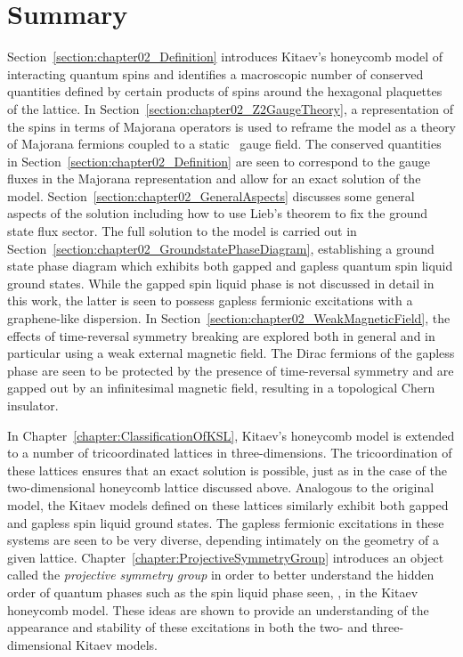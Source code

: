 \section{Summary}
\label{section:chapter02_Summary}
%
%
Section~\ref{section:chapter02_Definition} introduces Kitaev's honeycomb model of interacting quantum spins and identifies a macroscopic number of conserved quantities defined by certain products of spins around the hexagonal plaquettes of the lattice.
In Section~\ref{section:chapter02_Z2GaugeTheory}, a representation of the spins in terms of Majorana operators is used to reframe the model as a theory of Majorana fermions coupled to a static \ZZ~gauge field.
The conserved quantities in Section~\ref{section:chapter02_Definition} are seen to correspond to the gauge fluxes in the Majorana representation and allow for an exact solution of the model.
Section~\ref{section:chapter02_GeneralAspects} discusses some general aspects of the solution including how to use Lieb's theorem to fix the ground state flux sector.
The full solution to the model is carried out in Section~\ref{section:chapter02_GroundstatePhaseDiagram}, establishing a ground state phase diagram which exhibits both gapped and gapless quantum spin liquid ground states.
While the gapped spin liquid phase is not discussed in detail in this work, the latter is seen to possess gapless fermionic excitations with a graphene-like dispersion.
In Section~\ref{section:chapter02_WeakMagneticField}, the effects of time-reversal symmetry breaking are explored both in general and in particular using a weak external magnetic field.
The Dirac fermions of the gapless phase are seen to be protected by the presence of time-reversal symmetry and are gapped out by an infinitesimal magnetic field, resulting in a topological Chern insulator.

In Chapter~\ref{chapter:ClassificationOfKSL}, Kitaev's honeycomb model is extended to a number of tricoordinated lattices in three-dimensions.
The tricoordination of these lattices ensures that an exact solution is possible, just as in the case of the two-dimensional honeycomb lattice discussed above.
Analogous to the original model, the Kitaev models defined on these lattices similarly exhibit both gapped and gapless spin liquid ground states.
The gapless fermionic excitations in these systems are seen to be very diverse, depending intimately on the geometry of a given lattice.
Chapter~\ref{chapter:ProjectiveSymmetryGroup} introduces an object called the \textit{projective symmetry group} in order to better understand the hidden order of quantum phases such as the spin liquid phase seen, \eg, in the Kitaev honeycomb model.
These ideas are shown to provide an understanding of the appearance and stability of these excitations in both the two- and three-dimensional Kitaev models.
